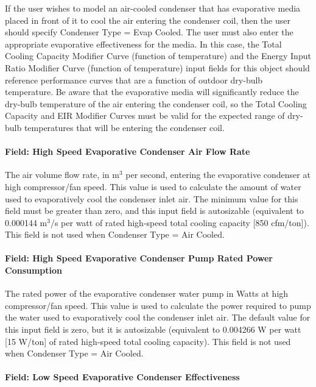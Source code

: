 If the user wishes to model an air-cooled condenser that has evaporative media placed in front of it to cool the air entering the condenser coil, then the user should specify Condenser Type = Evap Cooled. The user must also enter the appropriate evaporative effectiveness for the media. In this case, the Total Cooling Capacity Modifier Curve (function of temperature) and the Energy Input Ratio Modifier Curve (function of temperature) input fields for this object should reference performance curves that are a function of outdoor dry-bulb temperature. Be aware that the evaporative media will significantly reduce the dry-bulb temperature of the air entering the condenser coil, so the Total Cooling Capacity and EIR Modifier Curves must be valid for the expected range of dry-bulb temperatures that will be entering the condenser coil.

\paragraph{Field: High Speed Evaporative Condenser Air Flow Rate}\label{field-high-speed-evaporative-condenser-air-flow-rate}

The air volume flow rate, in m\(^{3}\) per second, entering the evaporative condenser at high compressor/fan speed. This value is used to calculate the amount of water used to evaporatively cool the condenser inlet air. The minimum value for this field must be greater than zero, and this input field is autosizable (equivalent to 0.000144 m\(^{3}\)/s per watt of rated high-speed total cooling capacity {[}850 cfm/ton{]}). This field is not used when Condenser Type = Air Cooled.

\paragraph{Field: High Speed Evaporative Condenser Pump Rated Power Consumption}\label{field-high-speed-evaporative-condenser-pump-rated-power-consumption}

The rated power of the evaporative condenser water pump in Watts at high compressor/fan speed. This value is used to calculate the power required to pump the water used to evaporatively cool the condenser inlet air. The default value for this input field is zero, but it is autosizable (equivalent to 0.004266 W per watt {[}15 W/ton{]} of rated high-speed total cooling capacity). This field is not used when Condenser Type = Air Cooled.

\paragraph{Field: Low Speed Evaporative Condenser Effectiveness}\label{field-low-speed-evaporative-condenser-effectiveness}

